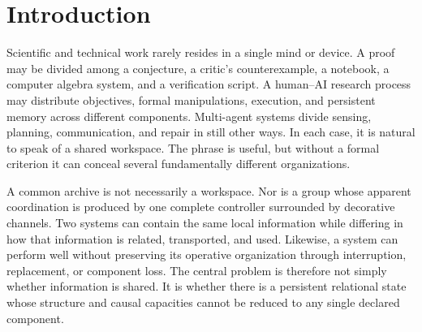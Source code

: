 \documentclass[11pt,letterpaper]{article}
\theoremstyle{plain}
\theoremstyle{definition}
\begin{document}
\begin{abstract}
Exact finite examples show how the same framework applies to human collaboration, human--AI
research loops, and multi-agent control. A review of adjacent work locates the individual
mathematical ingredients in established traditions including distributed cognition, local systems
and sheaves, spectral perturbation, sufficient statistics, structural causal models, frame reconstruction,
system identification, and feedback control. The candidate contribution is therefore
not a new name for any one of these constructions. It is their integration into a single falsifiable
account of persistent relational workspaces and the matched near misses that such an account
must reject. The framework does not infer phenomenal consciousness, personhood, or moral
status from coherence, agency, or self-maintenance.
\end{abstract}

\tableofcontents
\clearpage
{}

\section*{Introduction}

Scientific and technical work rarely resides in a single mind or device. A proof may be divided
among a conjecture, a critic's counterexample, a notebook, a computer algebra system, and a
verification script. A human--AI research process may distribute objectives, formal manipulations,
execution, and persistent memory across different components. Multi-agent systems divide sensing,
planning, communication, and repair in still other ways. In each case, it is natural to speak of a
shared workspace. The phrase is useful, but without a formal criterion it can conceal several
fundamentally different organizations.

A common archive is not necessarily a workspace. Nor is a group whose apparent coordination is
produced by one complete controller surrounded by decorative channels. Two systems can contain
the same local information while differing in how that information is related, transported, and used.
Likewise, a system can perform well without preserving its operative organization through interruption,
replacement, or component loss. The central problem is therefore not simply whether information is
shared. It is whether there is a persistent relational state whose structure and causal capacities cannot
be reduced to any single declared component.
\end{document}
